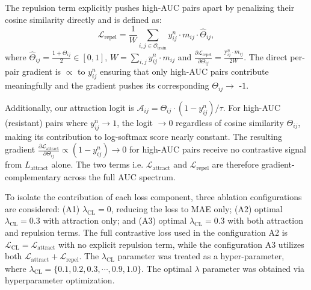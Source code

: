 \documentclass[sigconf,authordraft]{acmart}
\begin{document}
The repulsion term explicitly pushes high-AUC pairs apart by penalizing their cosine similarity directly and is defined as:
\begin{equation*}
\mathcal{L}_{\text{repel}} = \frac{1}{W}\sum_{i,j \in \mathcal{O}_{\text{train}}}y^{n}_{ij}\cdot m_{ij} \cdot \hat{\Theta}_{ij},
\end{equation*}
\noindent where $\hat{\Theta}_{ij} = \frac{1 + \Theta_{ij}}{2} \in [0, 1]$, $W = \sum_{i,j} y^{n}_{ij} \cdot m_{ij}$ and $\frac{\partial \mathcal{L}_{\text{repel}}}{\partial \Theta_{ij}} = \frac{\text{y}^{n}_{ij} \cdot m_{ij}}{2W}$. The direct per-pair gradient is $\propto$ to $y^{n}_{ij}$ ensuring that only high-AUC pairs contribute meaningfully and the gradient pushes its corresponding $\Theta_{ij} \rightarrow$ -$1$. %

Additionally, our attraction logit is $\mathcal{A}_{ij} = \Theta_{ij} \cdot (1 - y^{n}_{ij}) / \tau$. For high-AUC (resistant) pairs where $y^{n}_{ij} \rightarrow 1$, the logit $\rightarrow 0$ regardless of cosine similarity $\Theta_{ij}$, making its contribution to log-softmax score nearly constant. The resulting gradient $\frac{\partial \mathcal{L}_{\text{attract}}}{\partial \Theta_{ij}} \propto (1-y^{n}_{ij}) \rightarrow 0$ for high-AUC pairs receive no contrastive signal from $L_{\text{attract}}$ alone. The two terms i.e. $\mathcal{L}_{\text{attract}}$ and $\mathcal{L}_{\text{repel}}$ are therefore gradient-complementary across the full AUC spectrum.


To isolate the contribution of each loss component, three ablation configurations are considered: (A1) $\lambda_{\text{CL}} = 0$, reducing the loss to MAE only; (A2) optimal $\lambda_{\text{CL}} = 0.3$ with attraction only; and (A3) optimal $\lambda_{\text{CL}} = 0.3$ with both attraction and repulsion terms. The full contrastive loss used in the configuration A2 is 
$\mathcal{L}_{\text{CL}} = \mathcal{L}_{\text{attract}}$ with no explicit repulsion term, while the configuration A3 utilizes both $\mathcal{L}_{\text{attract}} + \mathcal{L}_{\text{repel}}$. The $\lambda_{\text{CL}}$ parameter was treated as a hyper-parameter, where $\lambda_{\text{CL}} =\{0.1,0.2,0.3,\cdots, 0.9,1.0\}$. The optimal $\lambda$ parameter was obtained via hyperparameter optimization.
\end{document}

